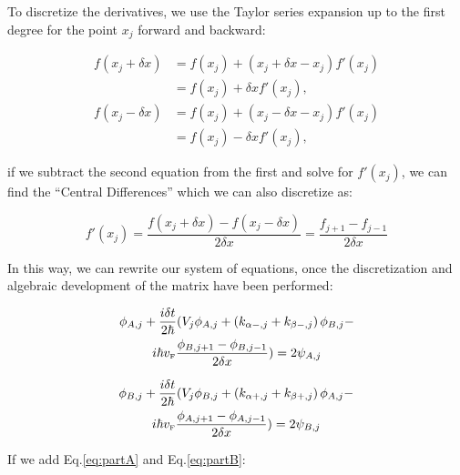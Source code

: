 To discretize the derivatives, we use the Taylor series expansion up to the first degree for the point $x_j$ forward and backward:

\begin{align}
    \label{eq:TaylorBeforeAndAfter}
    f(x_j+\delta x)&=f(x_j) + (x_j+\delta x-x_j)f'(x_j)\nonumber\\
    &=f(x_j)+\delta xf'(x_j),\nonumber\\
    f(x_j-\delta x)&=f(x_j) + (x_j-\delta x-x_j)f'(x_j)\nonumber\\
    &=f(x_j)-\delta xf'(x_j),
\end{align}

\noindent if we subtract the second equation from the first and solve for $f'(x_j)$, we can find the ``Central Differences'' which we can also discretize as:

\begin{equation}
    \label{eq:diferenciasCentradas}
    f'(x_j)=\frac{f(x_j+\delta x)-f(x_j-\delta x)}{2\delta x} = \frac{f_{j+1}-f_{j-1}}{2\delta x}
\end{equation}

In this way, we can rewrite our system of equations, once the discretization and algebraic development of the matrix have been performed:

\begin{multline}
    \label{eq:partA}
    \phi_{A, j} + \frac{i\delta t}{2\hbar}(V_j\phi_{A,j} + \left(k_{\alpha-,j}+k_{\beta-,j}\right)\phi_{B,j}-\\
    i\hbar v_{\mbox{\tiny F}}\frac{\phi_{B, j+1}-\phi_{B, j-1}}{2\delta x}) = 2\psi_{A,j}
\end{multline}

\begin{multline}
    \label{eq:partB}
    \phi_{B, j} + \frac{i\delta t}{2\hbar}(V_j\phi_{B,j} + \left(k_{\alpha+,j}+k_{\beta+,j}\right)\phi_{A,j}-\\
    i\hbar v_{\mbox{\tiny F}}\frac{\phi_{A, j+1}-\phi_{A, j-1}}{2\delta x}) = 2\psi_{B,j}
\end{multline}

If we add Eq.\eqref{eq:partA} and Eq.\eqref{eq:partB}:

